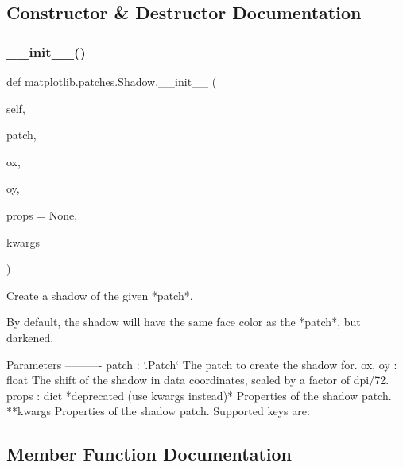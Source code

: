 \subsection{Constructor \& Destructor Documentation}
\mbox{\label{classmatplotlib_1_1patches_1_1Shadow_a5dca0810c2f39a86d49af3dad3820c17}} 
\subsubsection{\texorpdfstring{\+\_\+\+\_\+init\+\_\+\+\_\+()}{\_\_init\_\_()}}
{\footnotesize\ttfamily def matplotlib.\+patches.\+Shadow.\+\_\+\+\_\+init\+\_\+\+\_\+ (\begin{DoxyParamCaption}\item[{}]{self,  }\item[{}]{patch,  }\item[{}]{ox,  }\item[{}]{oy,  }\item[{}]{props = {\ttfamily None},  }\item[{}]{kwargs }\end{DoxyParamCaption})}

\begin{DoxyVerb}Create a shadow of the given *patch*.

By default, the shadow will have the same face color as the *patch*,
but darkened.

Parameters
----------
patch : `.Patch`
    The patch to create the shadow for.
ox, oy : float
    The shift of the shadow in data coordinates, scaled by a factor
    of dpi/72.
props : dict
    *deprecated (use kwargs instead)* Properties of the shadow patch.
**kwargs
    Properties of the shadow patch. Supported keys are:

\end{DoxyVerb}
 

\subsection{Member Function Documentation}
\mbox{\label{classmatplotlib_1_1patches_1_1Shadow_a16aa376b197d2117653be092c1028c1e}} 
